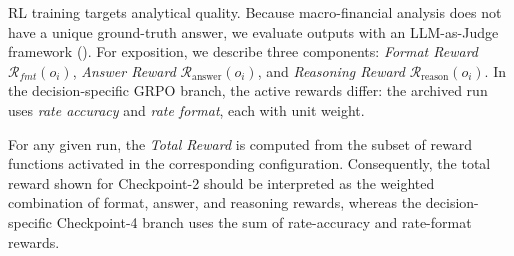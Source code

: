 RL training targets analytical quality. Because macro-financial analysis does not have a unique ground-truth answer, we evaluate outputs with an LLM-as-Judge framework (\cite{zheng2024judging}). For exposition, we describe three components: \textit{Format Reward} $\mathcal{R}_{fmt}(o_i)$, \textit{Answer Reward} $\mathcal{R}_{\text{answer}}(o_i)$, and \textit{Reasoning Reward} $\mathcal{R}_{\text{reason}}(o_i)$. In the decision-specific GRPO branch, the active rewards differ: the archived run uses \textit{rate accuracy} and \textit{rate format}, each with unit weight.



For any given run, the \textit{Total Reward} is computed from the subset of reward functions activated in the corresponding configuration. Consequently, the total reward shown for Checkpoint-2 should be interpreted as the weighted combination of format, answer, and reasoning rewards, whereas the decision-specific Checkpoint-4 branch uses the sum of rate-accuracy and rate-format rewards.

